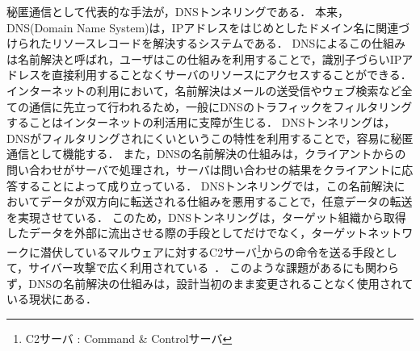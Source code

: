 秘匿通信として代表的な手法が，DNSトンネリングである．
本来，DNS(Domain Name System)は，IPアドレスをはじめとしたドメイン名に関連づけられたリソースレコードを解決するシステムである．
DNSによるこの仕組みは名前解決と呼ばれ，ユーザはこの仕組みを利用することで，識別子づらいIPアドレスを直接利用することなくサーバのリソースにアクセスすることができる．
インターネットの利用において，名前解決はメールの送受信やウェブ検索など全ての通信に先立って行われるため，一般にDNSのトラフィックをフィルタリングすることはインターネットの利活用に支障が生じる．
DNSトンネリングは，DNSがフィルタリングされにくいというこの特性を利用することで，容易に秘匿通信として機能する．
また，DNSの名前解決の仕組みは，クライアントからの問い合わせがサーバで処理され，サーバは問い合わせの結果をクライアントに応答することによって成り立っている．
DNSトンネリングでは，この名前解決においてデータが双方向に転送される仕組みを悪用することで，任意データの転送を実現させている．
このため，DNSトンネリングは，ターゲット組織から取得したデータを外部に流出させる際の手段としてだけでなく，ターゲットネットワークに潜伏しているマルウェアに対するC2サーバ\footnote{C2サーバ : Command \& Controlサーバ}からの命令を送る手段として，サイバー攻撃で広く利用されている~\cite{frameworkpos, bondupdater, bernhardpos, multigrainpos, pisloader, denis, dnsmessenger, udpos}．
このような課題があるにも関わらず，DNSの名前解決の仕組みは，設計当初のまま変更されることなく使用されている現状にある．
